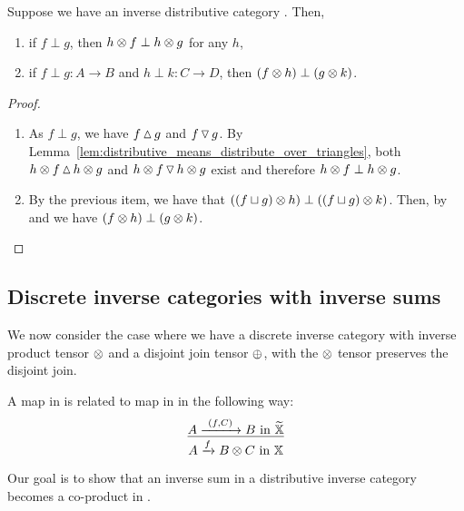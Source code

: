 \begin{corollary}\label{cor:inverse_product_and_disjointness}
  Suppose we have an inverse distributive category \X. Then,
  \begin{enumerate}[{(}i{)}]
    \item if $f \perp g$, then $h\otimes f \perp h\otimes  g$ for any $h$,
    \item  if  $f\perp g : A\to B$ and $h \perp k: C\to D$, then $(f\otimes h)\perp (g\otimes k)$.
   \end{enumerate}
\end{corollary}
\begin{proof}
  \prepprooflist
  \begin{enumerate}[{(}i{)}]
    \item As $f\perp g$, we have $f\operatorname{\vartriangle} g$ and $f\operatorname{\triangledown} g$. By
      Lemma~\ref{lem:distributive_means_distribute_over_triangles}, both $h\otimes f \operatorname{\vartriangle} h\otimes g$ and
      $h\otimes f \operatorname{\triangledown} h\otimes g$ exist and therefore $h\otimes f \perp h\otimes g$.
    \item By the previous item, we have that $((f\sqcup g)\otimes h) \perp ((f\sqcup g)\otimes k)$. Then, by
       and  we have $(f\otimes h)\perp (g\otimes k)$.
  \end{enumerate}
\end{proof}

\subsection{Discrete inverse categories with inverse sums} %
\label{sub:discrete_inverse_categories_with_inverse_sums}

We now consider the case where we have a discrete inverse category with inverse product
tensor $\otimes$ and a disjoint join tensor $\oplus$, with the $\otimes$ tensor preserves the
disjoint join.

A map in \Xt is related to map in \X in the following way:
\[
  \infer{A\xrightarrow{f} B\*C \text{ in }\X}{A \xrightarrow{\ (f,C)\ } B \text{ in } \Xt}
\]

Our goal is to show that an inverse sum in a distributive inverse category becomes a co-product
in \Xt.

